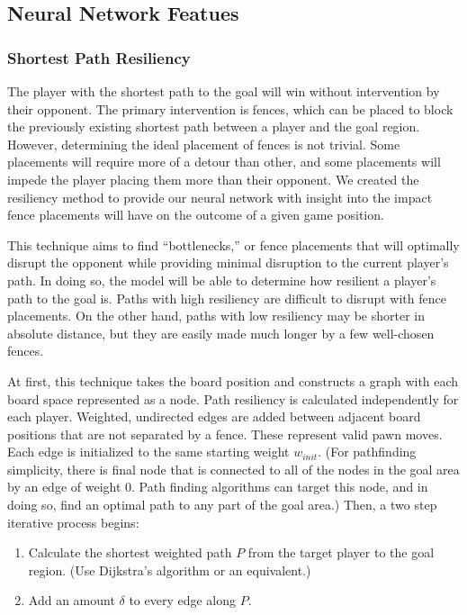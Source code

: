 \documentclass[10pt]{article}
\begin{document}
\subsection{Neural Network Featues}

\subsubsection{Shortest Path Resiliency}

The player with the shortest path to the goal will win without intervention by their opponent. The primary intervention is fences, which can be placed to block the previously existing shortest path between a player and the goal region. However, determining the ideal placement of fences is not trivial. Some placements will require more of a detour than other, and some placements will impede the player placing them more than their opponent. We created the resiliency method to provide our neural network with insight into the  impact fence placements will have on the outcome of a given game position.

This technique aims to find ``bottlenecks,'' or fence placements that will optimally disrupt the opponent while providing minimal disruption to the current player's path. In doing so, the model will be able to determine how resilient a player's path to the goal is. Paths with high resiliency are difficult to disrupt with fence placements. On the other hand, paths with low resiliency may be shorter in absolute distance, but they are easily made much longer by a few well-chosen fences.

At first, this technique takes the board position and constructs a graph with each board space represented as a node. Path resiliency is calculated independently for each player. Weighted, undirected edges are added between adjacent board positions that are not separated by a fence. These represent valid pawn moves. Each edge is initialized to the same starting weight $w_{init}$.
(For pathfinding simplicity, there is final node that is connected to all of the nodes in the goal area by an edge of weight 0. Path finding algorithms can target this node, and in doing so, find an optimal path to any part of the goal area.) %
Then, a two step iterative process begins:

\begin{enumerate}
    \item Calculate the shortest weighted path $P$ from the target player to the goal region. (Use Dijkstra's algorithm or an equivalent.)
    \item Add an amount $\delta$ to every edge along $P$.
\end{enumerate}
\end{document}
